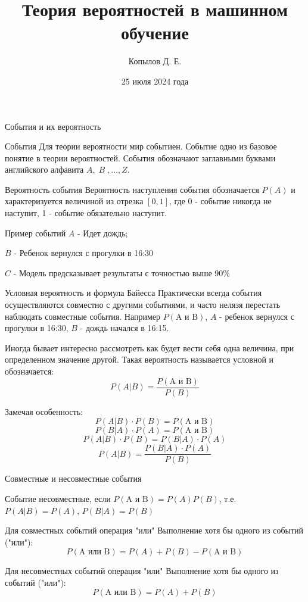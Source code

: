\documentclass[]{beamer}
\title[Тервер в МО]{Теория вероятностей в машинном обучение}
\author[Копылов Даниил]{Копылов Д. Е.}
\date{25 июля 2024 года}
\begin{document}
\begin{frame}
  \titlepage
\end{frame}

\begin{frame}{События и их вероятность}
	\begin{block}{События}
		Для теории вероятности мир событиен. Событие одно из базовое понятие в теории вероятностей.
		События обозначают заглавными буквами английского алфавита $A, \; B\; ,...,Z$.
	\end{block}
	\begin{block}{Вероятность события}
		Вероятность наступления события обозначается $P(A)$ и характеризуется величиной из отрезка $[0, 1]$, 
		где 0 - событие никогда не наступит, 1 - событие обязательно наступит.
	\end{block}
	
	\begin{block}{Пример событий}
		$A$ - Идет дождь;

		$B$ - Ребенок вернулся с прогулки в 16:30

		$C$ - Модель предсказывает результаты с точностью выше 90\%
	
	\end{block}
\end{frame}
\begin{frame}{Условная вероятность и формула Байесса}
	Практически всегда события осуществляются совместно с другими событиями, и часто нелязя перестать наблюдать совместные события.
	Например $P(\text{A и B})$,  $A$ - ребенок вернулся с прогулки в 16:30, $B$ - дождь начался в 16:15.
	
	Иногда бывает интересно рассмотреть как будет вести себя одна величина, при определенном значение другой. Такая вероятность называется 
	условной и обозначается:
	$$P(A|B) = \frac{P(\text{A и  B})}{P(B)}$$

	Замечая особенность:
	$$P(A|B)\cdot P(B) = P(\text{A и B})$$
	$$P(B|A)\cdot P(A) = P(\text{A и B})$$
	$$P(A|B)\cdot P(B) = P(B|A) \cdot P(A)$$
	\begin{equation}
		P(A|B) = \frac{P(B|A) \cdot P(A)}{P(B)}
	\end{equation}
\end{frame}
\begin{frame}{Совместные и несовместные события}
	\begin{block}{}
		Событие несовместные, если $P(\text{A и B}) = P(A)P(B)$, т.е. $P(A|B) = P(A)$, $P(B|A) = P(B)$
	\end{block}
	\begin{block}{Для совместных событий операция "или"}
		Выполнение хотя бы одного из событий ("или"):
		$$P(\text{A или B}) = P(A) + P(B) - P(\text{A и B})$$
	\end{block}
	\begin{block}{Для несовместных событий операция "или"}
		Выполнение хотя бы одного из событий ("или"):
		$$P(\text{A или B}) = P(A) + P(B)$$
	\end{block}

\end{frame}
\end{document}
